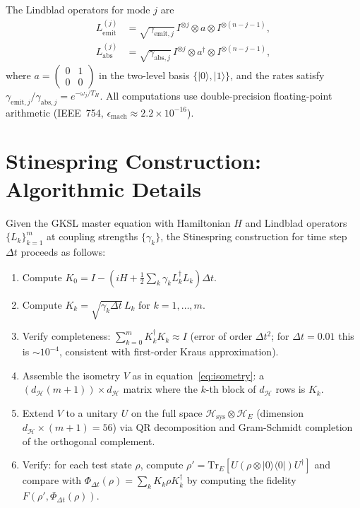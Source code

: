 \documentclass[11pt,twocolumn]{article}
\theoremstyle{remark}
\begin{document}
The Lindblad operators for mode $j$ are
\begin{align*}
  L^{(j)}_{\mathrm{emit}} &= \sqrt{\gamma_{\mathrm{emit},j}}\,
    I^{\otimes j} \otimes a \otimes I^{\otimes(n-j-1)},\\
  L^{(j)}_{\mathrm{abs}} &= \sqrt{\gamma_{\mathrm{abs},j}}\,
    I^{\otimes j} \otimes a^\dagger \otimes I^{\otimes(n-j-1)},
\end{align*}
where $a = \begin{pmatrix}0&1\\0&0\end{pmatrix}$ in the two-level basis
$\{|0\rangle,|1\rangle\}$, and the rates satisfy
$\gamma_{\mathrm{emit},j}/\gamma_{\mathrm{abs},j} = e^{-\omega_j/T_H}$.
All computations use double-precision floating-point arithmetic
(IEEE~754, $\epsilon_{\mathrm{mach}} \approx 2.2\times 10^{-16}$).

\section{Stinespring Construction: Algorithmic Details}
\label{app:stinespring}

Given the GKSL master equation with Hamiltonian $H$ and Lindblad
operators $\{L_k\}_{k=1}^m$ at coupling strengths $\{\gamma_k\}$,
the Stinespring construction for time step $\Delta t$ proceeds as
follows:

\begin{enumerate}[label=\arabic*.]
\item Compute $K_0 = I - (iH + \frac{1}{2}\sum_k \gamma_k L_k^\dagger L_k)\Delta t$.
\item Compute $K_k = \sqrt{\gamma_k \Delta t}\,L_k$ for $k=1,\ldots,m$.
\item Verify completeness: $\sum_{k=0}^m K_k^\dagger K_k \approx I$
  (error of order $\Delta t^2$; for $\Delta t = 0.01$ this is $\sim
  10^{-4}$, consistent with first-order Kraus approximation).
\item Assemble the isometry $V$ as in equation~\eqref{eq:isometry}:
  a $(d_\mathcal{H}(m+1))\times d_\mathcal{H}$ matrix where the
  $k$-th block of $d_\mathcal{H}$ rows is $K_k$.
\item Extend $V$ to a unitary $U$ on the full space $\mathcal{H}_{\mathrm{sys}}
  \otimes \mathcal{H}_E$ (dimension $d_\mathcal{H}\times(m+1) = 56$)
  via QR decomposition and Gram-Schmidt completion of the orthogonal
  complement.
\item Verify: for each test state $\rho$, compute $\rho' = \mathrm{Tr}_E[U
  (\rho\otimes|0\rangle\langle 0|)U^\dagger]$ and compare with
  $\Phi_{\Delta t}(\rho) = \sum_k K_k \rho K_k^\dagger$ by computing
  the fidelity $F(\rho', \Phi_{\Delta t}(\rho))$.
\end{enumerate}
\end{document}
